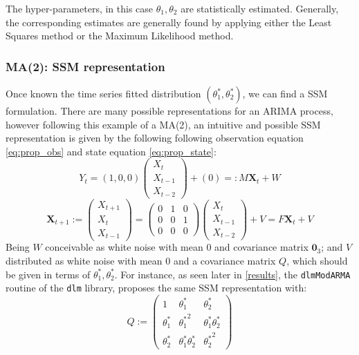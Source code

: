 \documentclass{article}
\theoremstyle{definition}
\theoremstyle{definition}
\theoremstyle{remark}
\theoremstyle{mythmstyle}
\begin{document}
The hyper-parameters, in this case $\theta_1, \theta_2$ are statistically estimated. Generally, the corresponding estimates are generally found by applying either the Least Squares method or the Maximum Likelihood method.

\subsubsection{MA(2): SSM representation}\label{ma2_ssm}

Once known the time series fitted distribution $(\theta_1^*, \theta_2^*)$, we can find a SSM formulation. There are many possible representations for an ARIMA process, however following this example of a MA(2), an intuitive and possible SSM representation is given by the following following observation equation \ref{eq:prop_obs} and state equation \ref{eq:prop_state}:
\begin{equation}\label{eq:prop_obs}
     Y_t = ( 1, 0, 0 ) \begin{pmatrix}
    X_{t} \\ X_{t-1} \\ X_{t-2}
    \end{pmatrix} + (0) =: M \mathbf{X}_t + W   
 \end{equation} \begin{equation}\label{eq:prop_state}
     \bm{X}_{t+1} := \begin{pmatrix}
     X_{t+1} \\ X_{t} \\ X_{t-1}
     \end{pmatrix} = \begin{pmatrix}
      0 & 1 & 0 \\ 0 & 0  & 1 \\ 0 & 0 & 0 
     \end{pmatrix}
     \begin{pmatrix}
     X_{t} \\ X_{t-1} \\ X_{t-2}
     \end{pmatrix} + V = F \mathbf{X}_t + V
 \end{equation}
Being $W$ conceivable as white noise with mean 0 and covariance matrix $\mathbf{0}_{3}$; and $V$ distributed as white noise with mean 0 and a covariance matrix $Q$, which should be given in terms of $\theta_1^*, \theta_2^*$. For instance, as seen later in \ref{results}, the \texttt{dlmModARMA} routine of the \texttt{dlm} library, proposes the same SSM representation with:
\begin{equation}
    Q := \begin{pmatrix}
         1 & \theta_1^* & \theta_2^* \\
      \theta_1^* & {\theta_1^*}^2 & \theta_1^* \theta_2^* \\ 
      \theta_2^* & \theta_1^* \theta_2^* & {\theta_2^*}^2
     \end{pmatrix}
\end{equation}
\end{document}
